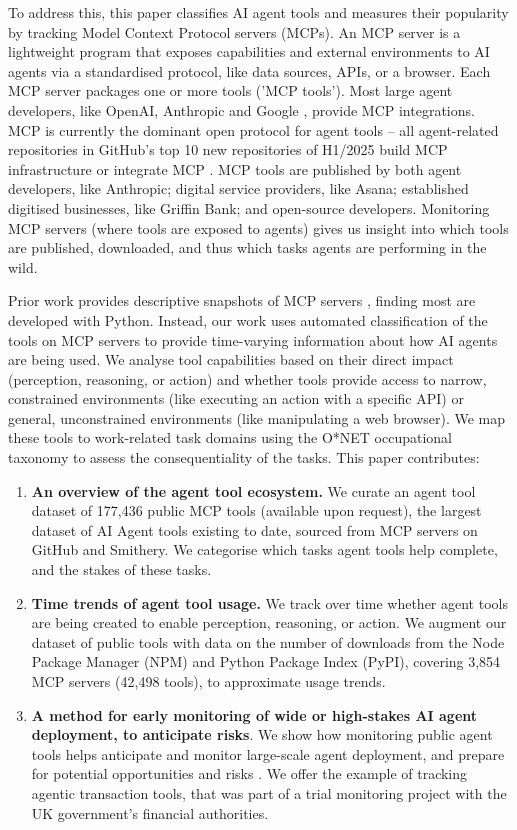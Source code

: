 \documentclass[manuscript,screen,nonacm,oneside]{acmart}
\begin{document}
To address this, this paper classifies AI agent tools and measures their popularity by tracking Model Context Protocol servers (MCPs). An MCP server is a lightweight program that exposes capabilities and external environments to AI agents via a standardised protocol, like data sources, APIs, or a browser. Each MCP server packages one or more tools ('MCP tools'). Most large agent developers, like OpenAI, Anthropic and Google \citep{casper2025agent}, provide MCP integrations. MCP is currently the dominant open protocol for agent tools -- all agent-related repositories in GitHub's top 10 new repositories of H1/2025 build MCP infrastructure or integrate MCP \citep{clickhouseClickHouseQuery,hackeroneWhatModel}. MCP tools are published by both agent developers, like Anthropic; digital service providers, like Asana; established digitised businesses, like Griffin Bank; and open-source developers. Monitoring MCP servers (where tools are exposed to agents) gives us insight into which tools are published, downloaded, and thus which tasks agents are performing in the wild.

Prior work provides descriptive snapshots of MCP servers \citep{lin2025large,ray2025survey,hou2025modelcontextprotocolmcp}, finding most are developed with Python. Instead, our work uses automated classification of the tools on MCP servers to provide time-varying information about how AI agents are being used. We analyse tool capabilities based on their direct impact (perception, reasoning, or action) and whether tools provide access to narrow, constrained environments (like executing an action with a specific API) or general, unconstrained environments (like manipulating a web browser). We map these tools to work-related task domains using the O*NET occupational taxonomy to assess the consequentiality of the tasks. This paper contributes:

\begin{enumerate}
\def\labelenumi{\arabic{enumi}.}
\item
 \textbf{An overview of the agent tool ecosystem.} We curate an agent tool dataset of 177,436 public MCP tools (available upon request), the largest dataset of AI Agent tools existing to date, sourced from MCP servers on GitHub and Smithery. We categorise which tasks agent tools help complete, and the stakes of these tasks.
\item
 \textbf{Time trends of agent tool usage.} We track over time whether agent tools are being created to enable perception, reasoning, or action. We augment our dataset of public tools with data on the number of downloads from the Node Package Manager (NPM) and Python Package Index (PyPI), covering 3,854 MCP servers (42,498 tools), to approximate usage trends. 
\item
 \textbf{A method for early monitoring of wide or high-stakes AI agent deployment, to anticipate risks}. We show how monitoring public agent tools helps anticipate and monitor large-scale agent deployment, and prepare for potential opportunities and risks \citep{stein2024role,bernardi2024societal}. We offer the example of tracking agentic transaction tools, that was part of a trial monitoring project with the UK government's financial authorities.
\end{enumerate}
\end{document}
